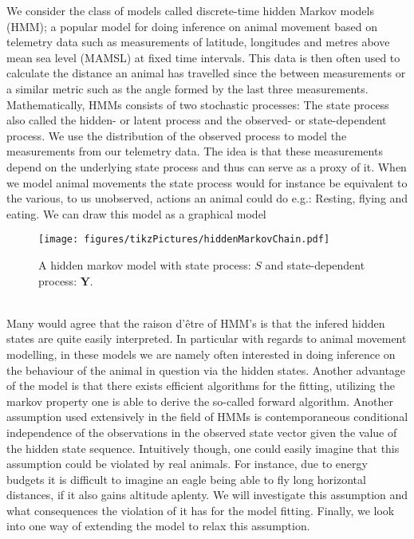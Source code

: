We consider the class of models called discrete-time hidden Markov models (HMM); a popular model for doing inference on animal movement based on telemetry data such as measurements of latitude, longitudes and metres above mean sea level (MAMSL) at fixed time intervals. This data is then often used to calculate the distance an animal has travelled since the between measurements or a similar metric such as the angle formed by the last three measurements.\\ Mathematically, HMMs consists of two stochastic processes: The state process also called the hidden- or latent process and the observed- or state-dependent process. 
We use the distribution of the observed process to model the measurements from our telemetry data. The idea is that these measurements depend on the underlying state process and thus can serve as a proxy of it. When we model animal movements the state process would for instance be equivalent to the various, to us unobserved, actions an animal could do e.g.: Resting, flying and eating. \cite{HHMForTimesSeries} We can draw this model as a graphical model
\begin{figure}[h]
    \centering
    \texttt{[image: figures/tikzPictures/hiddenMarkovChain.pdf]}
    \caption{A hidden markov model with state process: $S$ and state-dependent process: $\mathbf{Y}$.}
\end{figure}\\
Many would agree that the raison d'être of HMM's is that the infered hidden states are quite easily interpreted. In particular with regards to animal movement modelling, in these models we are namely often interested in doing inference on the behaviour of the animal in question via the hidden states. Another advantage of the model is that there exists efficient algorithms for the fitting, utilizing the markov property one is able to derive the so-called forward algorithm. Another assumption used extensively in the field of HMMs is contemporaneous conditional independence of the observations in the observed state vector given the value of the hidden state sequence. Intuitively though, one could easily imagine that this assumption could be violated by real animals. For instance, due to energy budgets it is difficult to imagine an eagle being able to fly long horizontal distances, if it also gains altitude aplenty. We will investigate this assumption and what consequences the violation of it has for the model fitting. Finally, we look into one way of extending the model to relax this assumption.